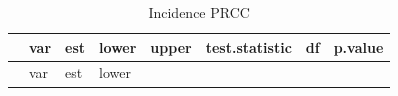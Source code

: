 \documentclass[
]{article}
\begin{document}
\begin{longtable}[]{@{}
  >{\raggedright\arraybackslash}p{}
  >{\raggedright\arraybackslash}p{}
  >{\raggedleft\arraybackslash}p{}
  >{\raggedleft\arraybackslash}p{}
  >{\raggedleft\arraybackslash}p{}
  >{\raggedleft\arraybackslash}p{}
  >{\raggedleft\arraybackslash}p{}
  >{\raggedleft\arraybackslash}p{}@{}}
\caption{Incidence PRCC}\tabularnewline
\toprule\noalign{}
\begin{minipage}[b]{\linewidth}\raggedright
\end{minipage} & \begin{minipage}[b]{\linewidth}\raggedright
var
\end{minipage} & \begin{minipage}[b]{\linewidth}\raggedleft
est
\end{minipage} & \begin{minipage}[b]{\linewidth}\raggedleft
lower
\end{minipage} & \begin{minipage}[b]{\linewidth}\raggedleft
upper
\end{minipage} & \begin{minipage}[b]{\linewidth}\raggedleft
test.statistic
\end{minipage} & \begin{minipage}[b]{\linewidth}\raggedleft
df
\end{minipage} & \begin{minipage}[b]{\linewidth}\raggedleft
p.value
\end{minipage} \\
\midrule\noalign{}
\endfirsthead
\toprule\noalign{}
\begin{minipage}[b]{\linewidth}\raggedright
\end{minipage} & \begin{minipage}[b]{\linewidth}\raggedright
var
\end{minipage} & \begin{minipage}[b]{\linewidth}\raggedleft
est
\end{minipage} & \begin{minipage}[b]{\linewidth}\raggedleft
lower
\end{minipage} & \begin{minipage}[b]{\linewidth}\raggedleft

\end{minipage}
\end{longtable}
\end{document}
